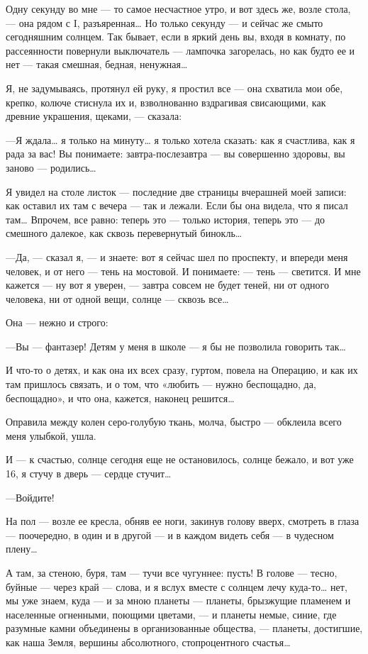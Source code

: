 \documentclass[11pt,openany]{book}
\begin{document}
Одну секунду во мне --- то самое несчастное утро, и вот здесь же, возле стола, --- она рядом с I, разъяренная\ldots{} Но только секунду --- и сейчас же смыто сегодняшним солнцем. Так бывает, если в яркий день вы, входя в комнату, по рассеянности повернули выключатель --- лампочка загорелась, но как будто ее и нет --- такая смешная, бедная, ненужная\ldots{}

Я, не задумываясь, протянул ей руку, я простил все --- она схватила мои обе, крепко, колюче стиснула их и, взволнованно вздрагивая свисающими, как древние украшения, щеками, --- сказала:

---Я ждала\ldots{} я только на минуту\ldots{} я только хотела сказать: как я счастлива, как я рада за вас! Вы понимаете: завтра-послезавтра --- вы совершенно здоровы, вы заново --- родились\ldots{}

Я увидел на столе листок --- последние две страницы вчерашней моей записи: как оставил их там с вечера --- так и лежали. Если бы она видела, что я писал там\ldots{} Впрочем, все равно: теперь это --- только история, теперь это --- до смешного далекое, как сквозь перевернутый бинокль\ldots{}

---Да, --- сказал я, --- и знаете: вот я сейчас шел по проспекту, и впереди меня человек, и от него --- тень на мостовой. И понимаете: --- тень --- светится. И мне кажется --- ну вот я уверен, --- завтра совсем не будет теней, ни от одного человека, ни от одной вещи, солнце --- сквозь все\ldots{}

Она --- нежно и строго:

---Вы --- фантазер! Детям у меня в школе --- я бы не позволила говорить так\ldots{}

И что-то о детях, и как она их всех сразу, гуртом, повела на Операцию, и как их там пришлось связать, и о том, что «любить --- нужно беспощадно, да, беспощадно», и что она, кажется, наконец решится\ldots{}

Оправила между колен серо-голубую ткань, молча, быстро --- обклеила всего меня улыбкой, ушла.

И --- к счастью, солнце сегодня еще не остановилось, солнце бежало, и вот уже 16, я стучу в дверь --- сердце стучит\ldots{}

---Войдите!

На пол --- возле ее кресла, обняв ее ноги, закинув голову вверх, смотреть в глаза --- поочередно, в один и в другой --- и в каждом видеть себя --- в чудесном плену\ldots{}

А там, за стеною, буря, там --- тучи все чугуннее: пусть! В голове --- тесно, буйные --- через край --- слова, и я вслух вместе с солнцем лечу куда-то\ldots{} нет,  мы уже знаем, куда --- и за мною планеты --- планеты, брызжущие пламенем и населенные огненными, поющими цветами, --- и планеты немые, синие, где разумные камни объединены в организованные общества, --- планеты, достигшие, как наша Земля, вершины абсолютного, стопроцентного счастья\ldots{}
\end{document}
